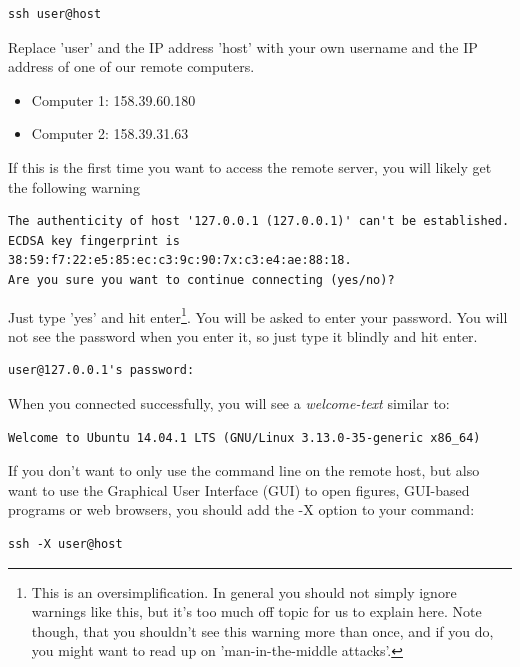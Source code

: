 \documentclass[11pt]{article}
\begin{document}
\begin{verbatim}
ssh user@host
\end{verbatim}


Replace 'user' and the IP address 'host' with your own
username and the IP address of one of our remote computers.
\begin{itemize}
\item Computer 1: 158.39.60.180
\item Computer 2: 158.39.31.63
\end{itemize}

If this is the first time you want to access the remote server, you
will likely get the following warning

\begin{verbatim}
The authenticity of host '127.0.0.1 (127.0.0.1)' can't be established.
ECDSA key fingerprint is 38:59:f7:22:e5:85:ec:c3:9c:90:7x:c3:e4:ae:88:18.
Are you sure you want to continue connecting (yes/no)?
\end{verbatim}

Just type 'yes' and hit enter\footnote{This is an oversimplification. In general you should not simply
ignore warnings like this, but it's too much off topic for us to
explain here. Note though, that you shouldn't see this warning more
than once, and if you do, you might want to read up on
'man-in-the-middle attacks'.}. You will be asked to enter your
password. You will not see the password when you enter it, so just
type it blindly and hit enter.


\begin{verbatim}
user@127.0.0.1's password:
\end{verbatim}

When you connected successfully, you will see a \emph{welcome-text} similar to:

\begin{verbatim}
Welcome to Ubuntu 14.04.1 LTS (GNU/Linux 3.13.0-35-generic x86_64)
\end{verbatim}


If you don't want to only use the command line on the remote host, but
also want to use the Graphical User Interface (GUI) to open figures,
GUI-based programs or web browsers, you should add the -X option to
your command:

\begin{verbatim}
ssh -X user@host
\end{verbatim}
\end{document}
